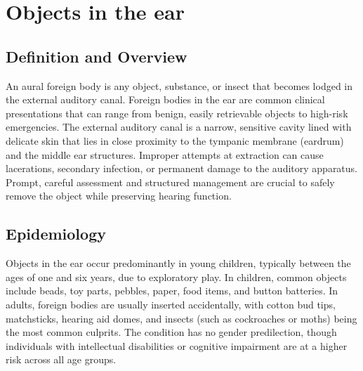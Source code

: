 \chapter{Objects in the ear}

\section*{Definition and Overview}
An aural foreign body is any object, substance, or insect that becomes lodged in the external auditory canal. Foreign bodies in the ear are common clinical presentations that can range from benign, easily retrievable objects to high-risk emergencies. The external auditory canal is a narrow, sensitive cavity lined with delicate skin that lies in close proximity to the tympanic membrane (eardrum) and the middle ear structures. Improper attempts at extraction can cause lacerations, secondary infection, or permanent damage to the auditory apparatus. Prompt, careful assessment and structured management are crucial to safely remove the object while preserving hearing function.

\section*{Epidemiology}
Objects in the ear occur predominantly in young children, typically between the ages of one and six years, due to exploratory play. In children, common objects include beads, toy parts, pebbles, paper, food items, and button batteries. In adults, foreign bodies are usually inserted accidentally, with cotton bud tips, matchsticks, hearing aid domes, and insects (such as cockroaches or moths) being the most common culprits. The condition has no gender predilection, though individuals with intellectual disabilities or cognitive impairment are at a higher risk across all age groups.


